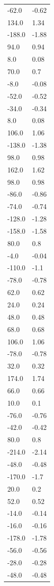 \begin{longtable}{ll}
-62.0 & -0.62 \\
134.0 & 1.34 \\
-188.0 & -1.88 \\
94.0 & 0.94 \\
8.0 & 0.08 \\
70.0 & 0.7 \\
-8.0 & -0.08 \\
-52.0 & -0.52 \\
-34.0 & -0.34 \\
8.0 & 0.08 \\
106.0 & 1.06 \\
-138.0 & -1.38 \\
98.0 & 0.98 \\
162.0 & 1.62 \\
98.0 & 0.98 \\
-86.0 & -0.86 \\
-74.0 & -0.74 \\
-128.0 & -1.28 \\
-158.0 & -1.58 \\
80.0 & 0.8 \\
-4.0 & -0.04 \\
-110.0 & -1.1 \\
-78.0 & -0.78 \\
62.0 & 0.62 \\
24.0 & 0.24 \\
48.0 & 0.48 \\
68.0 & 0.68 \\
106.0 & 1.06 \\
-78.0 & -0.78 \\
32.0 & 0.32 \\
174.0 & 1.74 \\
66.0 & 0.66 \\
10.0 & 0.1 \\
-76.0 & -0.76 \\
-42.0 & -0.42 \\
80.0 & 0.8 \\
-214.0 & -2.14 \\
-48.0 & -0.48 \\
-170.0 & -1.7 \\
20.0 & 0.2 \\
52.0 & 0.52 \\
-14.0 & -0.14 \\
-16.0 & -0.16 \\
-178.0 & -1.78 \\
-56.0 & -0.56 \\
-28.0 & -0.28 \\
-48.0 & -0.48 \\

\end{longtable}
